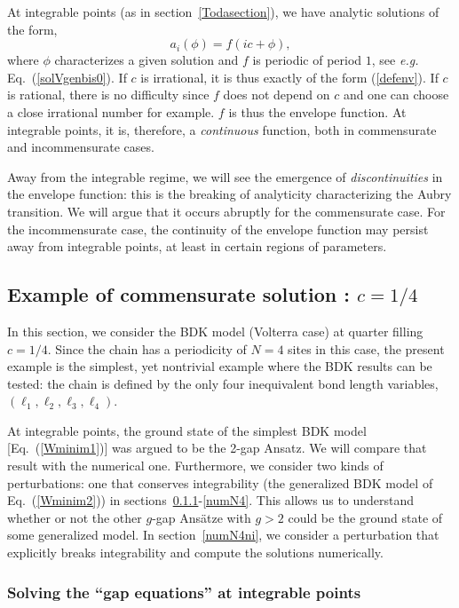 \documentclass[]{revtex4-1}
\begin{document}
At integrable points (as in section~\ref{Todasection}), we have analytic solutions of the form,
 \begin{equation}
a_i(\phi)=f(ic+\phi), \label{defenvelope} 
 \end{equation}
where $\phi$ characterizes a given solution and $f$ is periodic of period $1$, see \textit{e.g.} Eq.~(\ref{solVgenbis0}).  If $c$ is irrational,
it is thus exactly of the form (\ref{defenv}). If $c$ is rational,
there is no difficulty since $f$ does not depend on $c$ and one can choose a close irrational number for example. $f$ is thus the envelope function. At integrable points, it is, therefore, a \textit{continuous} function, both in commensurate and incommensurate cases. 
 
 Away from the integrable regime, we will see the emergence of \textit{discontinuities} in the envelope function: this is the breaking of analyticity characterizing the Aubry transition. We will argue that it occurs abruptly for the commensurate case. For the incommensurate case, the continuity of the envelope function may persist away from integrable points, at least in certain regions of parameters.

  \subsection{Example of commensurate solution : $c=1/4$}
 \label{commex}

 In this section, we consider the BDK model (Volterra case) at quarter filling $c=1/4$. Since the chain has a periodicity of $N=4$ sites in this case, the present example is the simplest, yet nontrivial example where the BDK results can be tested: the chain is defined by the only four inequivalent bond length variables, $(\ell_1,\ell_2,\ell_3,\ell_4)$.

 At integrable points, the ground state of the simplest BDK model [Eq.~(\ref{Wminim1})] was argued to be the 2-gap Ansatz. We will compare that result with the numerical one. Furthermore, we consider two kinds of perturbations: one that conserves integrability (the generalized BDK model of Eq.~(\ref{Wminim2})) in sections~\ref{intquarter}-\ref{numN4}. This allows us to understand whether or not the other $g$-gap Ans\"atze with $g>2$ could be the ground state of some generalized model. In section~\ref{numN4ni}, we consider a perturbation that explicitly breaks integrability and compute the solutions numerically.



\subsubsection{Solving the ``gap equations'' at integrable points} \label{intquarter}
\end{document}
